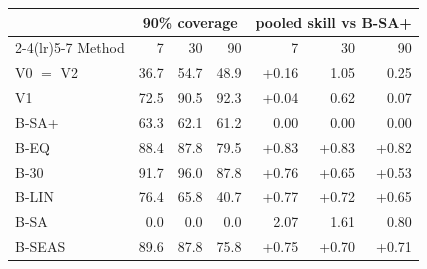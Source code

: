 \begin{tabular}{l rrr rrr}
\toprule
 & \multicolumn{3}{c}{90\% coverage} & \multicolumn{3}{c}{pooled skill vs B-SA+}\\
\cmidrule(lr){2-4}\cmidrule(lr){5-7}
Method & 7 & 30 & 90 & 7 & 30 & 90\\
\midrule
V0 $=$ V2 & 36.7 & 54.7 & 48.9 & +0.16 & \textminus{}1.05 & \textminus{}0.25 \\
V1 & 72.5 & 90.5 & 92.3 & +0.04 & \textminus{}0.62 & \textminus{}0.07 \\
B-SA+ & 63.3 & 62.1 & 61.2 & 0.00 & 0.00 & 0.00 \\
B-EQ & 88.4 & 87.8 & 79.5 & +0.83 & +0.83 & +0.82 \\
B-30 & 91.7 & 96.0 & 87.8 & +0.76 & +0.65 & +0.53 \\
B-LIN & 76.4 & 65.8 & 40.7 & +0.77 & +0.72 & +0.65 \\
B-SA & 0.0 & 0.0 & 0.0 & \textminus{}2.07 & \textminus{}1.61 & \textminus{}0.80 \\
B-SEAS & 89.6 & 87.8 & 75.8 & +0.75 & +0.70 & +0.71 \\
\bottomrule
\end{tabular}
